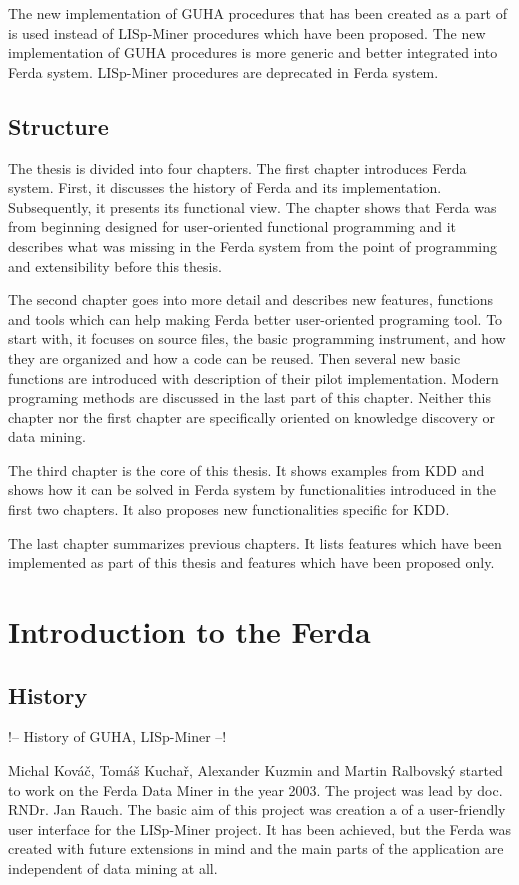 \documentclass[a4paper,12pt]{book}
\begin{document}
The new implementation of GUHA procedures that has been created as a part of \cite[diploma thesis of Tomáš Kuchař]{thesisKuchar} is used instead of LISp-Miner procedures which have been proposed. The new implementation of GUHA procedures is more generic and better integrated into Ferda system. LISp-Miner procedures are deprecated in Ferda system.

\section*{Structure}
The thesis is divided into four chapters. The first chapter introduces Ferda system. First, it discusses the history of Ferda and its implementation. Subsequently, it presents its functional view. The chapter shows that Ferda was from beginning designed for user-oriented functional programming and it describes what was missing in the Ferda system from the point of programming and extensibility before this thesis.

The second chapter goes into more detail and describes new features, functions and tools which can help making Ferda better user-oriented programing tool. To start with, it focuses on source files, the basic programming instrument, and how they are organized and how a code can be reused. Then several new basic functions are introduced with description of their pilot implementation. Modern programing methods are discussed in the last part of this chapter. Neither this chapter nor the first chapter are specifically oriented on knowledge discovery or data mining.

The third chapter is the core of this thesis. It shows examples from KDD and shows how it can be solved in Ferda system by functionalities introduced in the first two chapters. It also proposes new functionalities specific for KDD.

The last chapter summarizes previous chapters. It lists features which have been implemented as part of this thesis and features which have been proposed only.

\chapter{Introduction to the Ferda}
\section{History}
!-- History of GUHA, LISp-Miner --!

Michal Kováč, Tomáš Kuchař, Alexander Kuzmin and Martin Ralbovský started to work on the Ferda Data Miner in the year 2003. The project was lead by doc. RNDr. Jan Rauch. The basic aim of this project was creation a of a user-friendly user interface for the LISp-Miner project. It has been achieved, but the Ferda was created with future extensions in mind and the main parts of the application are independent of data mining at all.
\end{document}
